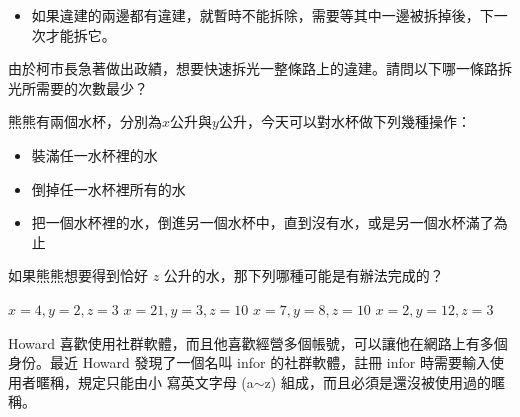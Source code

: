 \documentclass[a4paper, 12pt, addpoints]{exam}
\begin{document}
\begin{questions}
\begin{itemize}
        \item 如果違建的兩邊都有違建，就暫時不能拆除，需要等其中一邊被拆掉後，下一次才能拆它。

    \end{itemize}
    由於柯市⻑急著做出政績，想要快速拆光⼀整條路上的違建。請問以下哪⼀條路拆光所需要的次數最少？
    \begin{choices}
        \choice {}
        \choice {}
        \choice {}
        \choice {}

    \end{choices}

    \question[4] 熊熊有兩個水杯，分別為$x$公升與$y$公升，今天可以對水杯做下列幾種操作：
    \begin{itemize}
        \item 裝滿任一水杯裡的水
        \item 倒掉任一水杯裡所有的水
        \item 把⼀個⽔杯裡的⽔，倒進另⼀個⽔杯中，直到沒有⽔，或是另⼀個⽔杯滿了為⽌
    \end{itemize}

    如果熊熊想要得到恰好 $z$ 公升的⽔，那下列哪種可能是有辦法完成的？

    \begin{choices}
        \choice $x=4, y=2, z=3$
        \choice $x=21, y=3, z=10$
        \choice $x=7, y=8, z= 10$
        \choice $x=2, y=12, z=3$
    \end{choices}

    \question[4]
    Howard 喜歡使⽤社群軟體，⽽且他喜歡經營多個帳號，可以讓他在網路上有多個⾝份。最近 Howard 發現了⼀個名叫 infor 的社群軟體，註冊 infor 時需要輸⼊使⽤者暱稱，規定只能由⼩
    寫英⽂字⺟ (a$\sim$z) 組成，⽽且必須是還沒被使⽤過的暱稱。


\end{questions}
\end{document}
